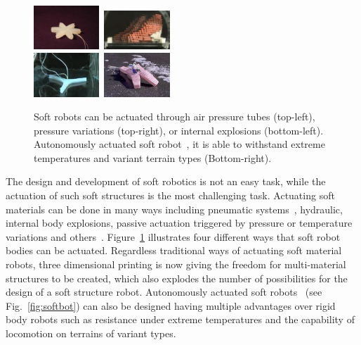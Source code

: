 \documentclass{sig-alternate}
\begin{document}
\begin{figure}[h!]
\centering
\includegraphics[width=0.22\textwidth,height=0.12\textheight]{../Figures/Misc/soft_robotics_figure.png}\		
\includegraphics[width=0.22\textwidth,height=0.12\textheight]{../Figures/Misc/hillerPressureChamber.png}\\[0.1cm]	
\includegraphics[width=0.22\textwidth,height=0.12\textheight]{../Figures/Misc/ExplodingRobot.jpg}\	
\includegraphics[width=0.22\textwidth,height=0.12\textheight]{../Figures/Misc/softbot.jpg}\\
\caption{Soft robots can be actuated through air pressure tubes (top-left), pressure variations (top-right), or internal explosions (bottom-left). Autonomously actuated soft robot~\cite{tolleyresilient}, it is able to withstand extreme temperatures and variant terrain types (Bottom-right).}
\label{fig:softRobotsActuation}
\end{figure}

The design and development of soft robotics is not an easy task, while the actuation of such soft structures is the most challenging task. Actuating soft materials can be done in many ways including pneumatic systems~\cite{ilievski2011soft, shepherd2011multigait}, hydraulic, internal body explosions, passive actuation triggered by pressure or temperature variations and others~\cite{laschi2012soft, seok2010peristaltic}. Figure~\ref{fig:softRobotsActuation} illustrates four different ways that soft robot bodies can be actuated. Regardless traditional ways of actuating soft material robots, three dimensional printing is now giving the freedom for multi-material structures to be created, which also explodes the number of possibilities for the design of a soft structure robot. Autonomously actuated soft robots~\cite{tolleyresilient} (see Fig.~\ref{fig:softbot}) can also be designed having multiple advantages over rigid body robots such as resistance under extreme temperatures and the capability of locomotion on terrains of variant types.
\end{document}
